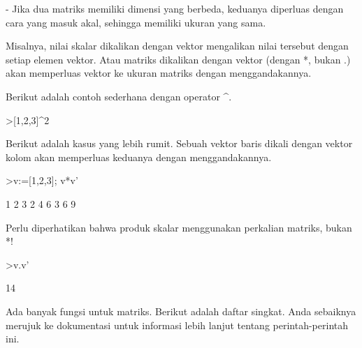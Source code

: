 \documentclass[a4paper,10pt]{article}
\begin{document}
\begin{eulernotebook}
\begin{eulercomment}
\begin{eulercomment}
\begin{eulercomment}
\begin{eulercomment}
\begin{eulercomment}
\begin{eulercomment}
\begin{eulercomment}
- Jika dua matriks memiliki dimensi yang berbeda, keduanya diperluas
dengan cara yang masuk akal, sehingga memiliki ukuran yang sama.

Misalnya, nilai skalar dikalikan dengan vektor mengalikan nilai
tersebut dengan setiap elemen vektor. Atau matriks dikalikan dengan
vektor (dengan *, bukan .) akan memperluas vektor ke ukuran matriks
dengan menggandakannya.

Berikut adalah contoh sederhana dengan operator \textasciicircum{}.
\end{eulercomment}
\begin{eulerprompt}
>[1,2,3]^2
\end{eulerprompt}
\begin{euleroutput}
  [1,  4,  9]
\end{euleroutput}
\begin{eulercomment}
Berikut adalah kasus yang lebih rumit. Sebuah vektor baris dikali
dengan vektor kolom akan memperluas keduanya dengan menggandakannya.
\end{eulercomment}
\begin{eulerprompt}
>v:=[1,2,3]; v*v'
\end{eulerprompt}
\begin{euleroutput}
              1             2             3 
              2             4             6 
              3             6             9 
\end{euleroutput}
\begin{eulercomment}
Perlu diperhatikan bahwa produk skalar menggunakan perkalian matriks,
bukan *!
\end{eulercomment}
\begin{eulerprompt}
>v.v'
\end{eulerprompt}
\begin{euleroutput}
  14
\end{euleroutput}
\begin{eulercomment}
Ada banyak fungsi untuk matriks. Berikut adalah daftar singkat. Anda
sebaiknya merujuk ke dokumentasi untuk informasi lebih lanjut tentang
perintah-perintah ini.


\end{eulercomment}
\end{eulercomment}
\end{eulercomment}
\end{eulercomment}
\end{eulercomment}
\end{eulercomment}
\end{eulercomment}
\end{eulernotebook}
\end{document}
